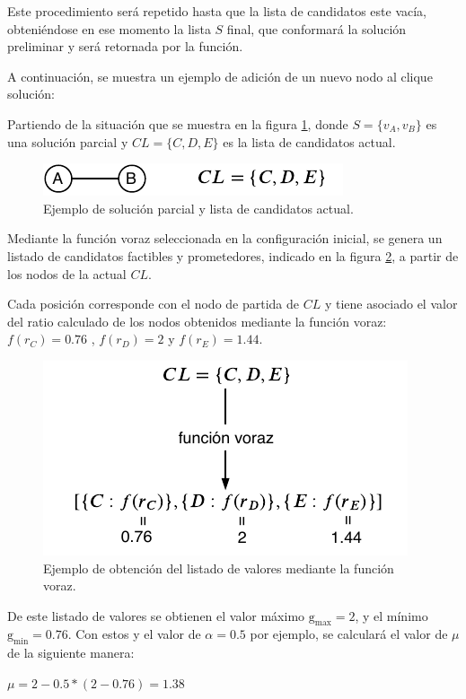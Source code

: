 Este procedimiento será repetido hasta que la lista de candidatos este vacía, obteniéndose en ese momento la lista $S$ final, que conformará la solución preliminar y será retornada por la función.

A continuación, se muestra un ejemplo de adición de un nuevo nodo al clique solución:

Partiendo de la situación que se muestra en la figura \ref{fig:const:cliq-cl}, donde  $S = \{v_A, v_B\}$ es una solución parcial y $ CL = \{C,D,E\} $ es la lista de candidatos actual.

\begin{figure}[H]
	\centering
	\includegraphics[scale=2]{Figures/proc-const/clique-y-cl.pdf}
	\caption{\footnotesize Ejemplo de solución parcial y lista de candidatos actual.}
	\label{fig:const:cliq-cl}
\end{figure}

Mediante la función voraz seleccionada en la configuración inicial, se genera un listado de candidatos factibles y prometedores, indicado en la figura \ref{fig:const:func-voraz}, a partir de los nodos de la actual $CL$.

Cada posición corresponde con el nodo de partida de $CL$ y tiene asociado el valor del ratio calculado de los nodos obtenidos mediante la función voraz: $f(r_C)=0.76$ , $f(r_D)=2$ y $f(r_E)=1.44$.

\begin{figure}[H]
	\centering
	\includegraphics[scale=2]{Figures/proc-const/func-voraz.pdf}
	\caption{\footnotesize Ejemplo de obtención del listado de valores mediante la función voraz.}
	\label{fig:const:func-voraz}
\end{figure}

De este listado de valores se obtienen el valor máximo $\mathrm{g_{max}}=2$, y el mínimo $\mathrm{g_{min}}=0.76$. Con estos y el valor de $\alpha = 0.5$ por ejemplo, se calculará el valor de $\mu$ de la siguiente manera:
\begin{center}
	$\mu = 2 - 0.5 * (2 - 0.76) = 1.38$
\end{center}

